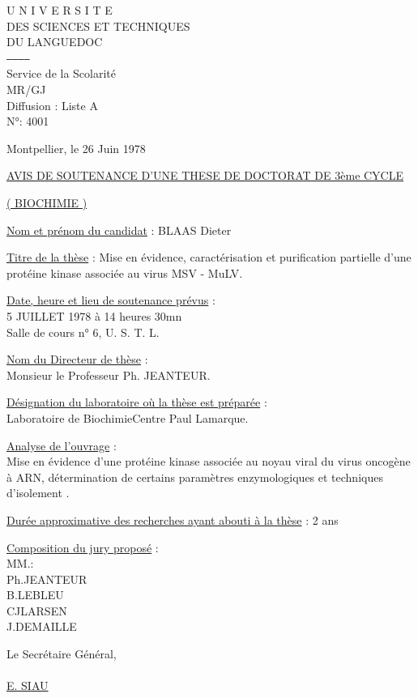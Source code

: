 U N I V E R S I T E\\
DES SCIENCES ET TECHNIQUES\\
DU LANGUEDOC\\
\texttt{------------}\\
Service de la Scolarité\\
MR/GJ\\
Diffusion : Liste A\\
N°: 4001

Montpellier, le 26 Juin 1978

\uline{AVIS DE SOUTENANCE D'UNE THESE DE DOCTORAT DE 3ème CYCLE}

\uline{( BIOCHIMIE )}

\uline{Nom et prénom du candidat} : BLAAS Dieter

\uline{Titre de la thèse} : Mise en évidence, caractérisation et purification partielle d'une protéine kinase associée au virus MSV - MuLV.

\uline{Date, heure et lieu de soutenance prévus} :\\
5 JUILLET 1978 à 14 heures 30mn\\
Salle de cours n° 6, U. S. T. L.

\uline{Nom du Directeur de thèse} :\\
Monsieur le Professeur Ph. JEANTEUR.

\uline{Désignation du laboratoire où la thèse est préparée} :\\
Laboratoire de Biochimie\quad Centre Paul Lamarque.

\uline{Analyse de l'ouvrage} :\\
Mise en évidence d'une protéine kinase associée au noyau viral du virus oncogène à ARN, détermination de certains paramètres enzymologiques et techniques d'isolement .

\uline{Durée approximative des recherches ayant abouti à la thèse} : 2 ans

\uline{Composition du jury proposé} :\\
MM.\qquad :\\
Ph.\quad JEANTEUR\\
B.\quad LEBLEU\\
CJ\quad LARSEN\\
J.\quad DEMAILLE

Le Secrétaire Général,\\

\\

\uline{E. SIAU}



